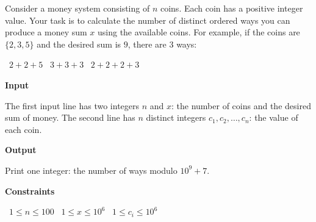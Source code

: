 Consider a money system consisting of $n$ coins. Each coin has a positive integer value. Your task is to calculate the number of distinct ordered ways you can produce a money sum $x$ using the available coins.
For example, if the coins are $\{2,3,5\}$ and the desired sum is $9$, there are $3$ ways:

\textbullet\ $2+2+5$
\textbullet\ $3+3+3$
\textbullet\ $2+2+2+3$

\vspace{0.3cm}\noindent\textbf{Input}

The first input line has two integers $n$ and $x$: the number of coins and the desired sum of money.
The second line has $n$ distinct integers $c_1,c_2,\dots,c_n$: the value of each coin.

\vspace{0.3cm}\noindent\textbf{Output}

Print one integer: the number of ways modulo $10^9+7$.

\vspace{0.3cm}\noindent\textbf{Constraints}

\textbullet\ $1 \le n \le 100$
\textbullet\ $1 \le x \le 10^6$
\textbullet\ $1 \le c_i \le 10^6$
